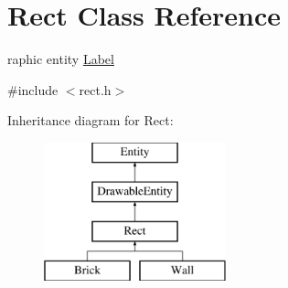 \hypertarget{class_rect}{}\section{Rect Class Reference}
\label{class_rect}


raphic entity \hyperlink{class_label}{Label}  




{\ttfamily \#include $<$rect.\+h$>$}

Inheritance diagram for Rect\+:\begin{figure}[H]
\begin{center}
\leavevmode
\includegraphics[height=4.000000cm]{class_rect}
\end{center}
\end{figure}

